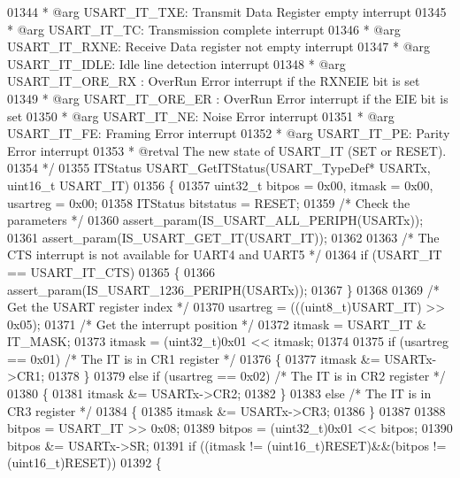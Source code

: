 \begin{DoxyCode}
01344 \textcolor{comment}{  *            @arg USART\_IT\_TXE:  Transmit Data Register empty interrupt}
01345 \textcolor{comment}{  *            @arg USART\_IT\_TC:   Transmission complete interrupt}
01346 \textcolor{comment}{  *            @arg USART\_IT\_RXNE: Receive Data register not empty interrupt}
01347 \textcolor{comment}{  *            @arg USART\_IT\_IDLE: Idle line detection interrupt}
01348 \textcolor{comment}{  *            @arg USART\_IT\_ORE\_RX : OverRun Error interrupt if the RXNEIE bit is set}
01349 \textcolor{comment}{  *            @arg USART\_IT\_ORE\_ER : OverRun Error interrupt if the EIE bit is set  }
01350 \textcolor{comment}{  *            @arg USART\_IT\_NE:   Noise Error interrupt}
01351 \textcolor{comment}{  *            @arg USART\_IT\_FE:   Framing Error interrupt}
01352 \textcolor{comment}{  *            @arg USART\_IT\_PE:   Parity Error interrupt}
01353 \textcolor{comment}{  * @retval The new state of USART\_IT (SET or RESET).}
01354 \textcolor{comment}{  */}
01355 ITStatus USART_GetITStatus(USART\_TypeDef* USARTx, uint16\_t USART\_IT)
01356 \{
01357   uint32\_t bitpos = 0x00, itmask = 0x00, usartreg = 0x00;
01358   ITStatus bitstatus = RESET;
01359   \textcolor{comment}{/* Check the parameters */}
01360   assert_param(IS\_USART\_ALL\_PERIPH(USARTx));
01361   assert_param(IS\_USART\_GET\_IT(USART\_IT));
01362 
01363   \textcolor{comment}{/* The CTS interrupt is not available for UART4 and UART5 */}
01364   \textcolor{keywordflow}{if} (USART\_IT == USART_IT_CTS)
01365   \{
01366     assert_param(IS\_USART\_1236\_PERIPH(USARTx));
01367   \}
01368 
01369   \textcolor{comment}{/* Get the USART register index */}
01370   usartreg = (((uint8\_t)USART\_IT) >> 0x05);
01371   \textcolor{comment}{/* Get the interrupt position */}
01372   itmask = USART\_IT & IT_MASK;
01373   itmask = (uint32\_t)0x01 << itmask;
01374 
01375   \textcolor{keywordflow}{if} (usartreg == 0x01) \textcolor{comment}{/* The IT  is in CR1 register */}
01376   \{
01377     itmask &= USARTx->CR1;
01378   \}
01379   \textcolor{keywordflow}{else} \textcolor{keywordflow}{if} (usartreg == 0x02) \textcolor{comment}{/* The IT  is in CR2 register */}
01380   \{
01381     itmask &= USARTx->CR2;
01382   \}
01383   \textcolor{keywordflow}{else} \textcolor{comment}{/* The IT  is in CR3 register */}
01384   \{
01385     itmask &= USARTx->CR3;
01386   \}
01387 
01388   bitpos = USART\_IT >> 0x08;
01389   bitpos = (uint32\_t)0x01 << bitpos;
01390   bitpos &= USARTx->SR;
01391   \textcolor{keywordflow}{if} ((itmask != (uint16\_t)RESET)&&(bitpos != (uint16\_t)RESET))
01392   \{

\end{DoxyCode}
